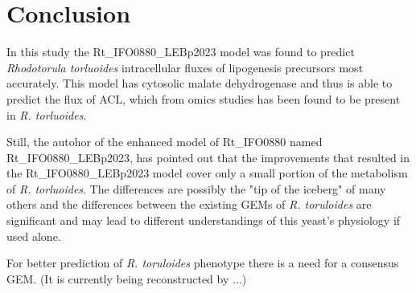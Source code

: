 \chapter{Conclusion}

In this study the Rt\_IFO0880\_LEBp2023 model was found to predict \textit{Rhodotorula torluoides} intracellular fluxes of lipogenesis precursors most accurately.
This model has cytosolic malate dehydrogenase and thus is able to predict the flux of ACL, which from omics studies has been found to be present in \textit{R. torluoides}.

Still, the autohor of the enhanced model of Rt\_IFO0880 named Rt\_IFO0880\_LEBp2023, has pointed out that the improvements that resulted in the Rt\_IFO0880\_LEBp2023 
model cover only a small portion of the metabolism of \textit{R. torluoides}. The differences are possibly the "tip of the iceberg" of many others and
the differences between the existing GEMs of \textit{R. toruloides} are significant and may lead to different understandings of
this yeast's physiology if used alone. \cite{DeBiaggi2023}

For better prediction of \textit{R. toruloides} phenotype there is a need for a consensus GEM. (It is currently being reconstructed by ...)

